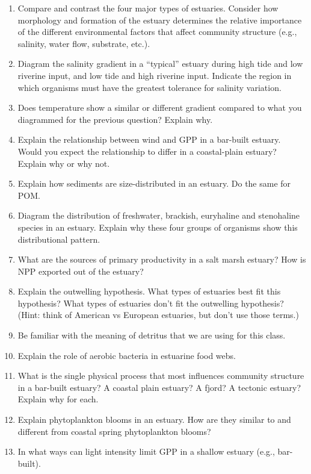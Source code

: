 \documentclass[nofonts, letterpaper]{tufte-handout}
\begin{document}
\begin{enumerate}
\item
  Compare and contrast the four major types of estuaries. Consider how
  morphology and formation of the estuary determines the relative
  importance of the different environmental factors that affect
  community structure (e.g., salinity, water flow, substrate, etc.).
\item
  Diagram the salinity gradient in a ``typical'' estuary during high
  tide and low riverine input, and low tide and high riverine input.
  Indicate the region in which organisms must have the greatest
  tolerance for salinity variation.
\item
  Does temperature show a similar or different gradient compared to what
  you diagrammed for the previous question? Explain why.
\item
  Explain the relationship between wind and GPP in a bar-built estuary.
  Would you expect the relationship to differ in a coastal-plain
  estuary? Explain why or why not.
\item
  Explain how sediments are size-distributed in an estuary. Do the same
  for POM.
\item
  Diagram the distribution of freshwater, brackish, euryhaline and
  stenohaline species in an estuary. Explain why these four groups of
  organisms show this distributional pattern.
\item
  What are the sources of primary productivity in a salt marsh estuary?
  How is NPP exported out of the estuary?
\item
  Explain the outwelling hypothesis. What types of estuaries best fit
  this hypothesis? What types of estuaries don't fit the outwelling
  hypothesis? (Hint: think of American vs European estuaries, but don't
  use those terms.)
\item
  Be familiar with the meaning of detritus that we are using for this
  class.
\item
  Explain the role of aerobic bacteria in estuarine food webs.
\item
  What is the single physical process that most influences community
  structure in a bar-built estuary? A coastal plain estuary? A fjord? A
  tectonic estuary? Explain why for each.
\item
  Explain phytoplankton blooms in an estuary. How are they similar to
  and different from coastal spring phytoplankton blooms?
\item
  In what ways can light intensity limit GPP in a shallow estuary (e.g.,
  bar-built).
\end{enumerate}
\end{document}
